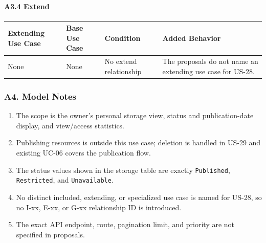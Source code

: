 \documentclass[12pt]{article}
\renewcommand{\baselinestretch}{1.5}
\begin{document}
\hypertarget{sec:a3-4-extend}{}
\paragraph*{A3.4 Extend}
\par\medskip

\begingroup
\small
\renewcommand{\baselinestretch}{1.0}\selectfont
\renewcommand{\arraystretch}{1.15}
\setlength{\tabcolsep}{6pt}
\begin{longtable}{|>{\raggedright\arraybackslash}p{}|>{\raggedright\arraybackslash}p{}|>{\raggedright\arraybackslash}p{}|>{\raggedright\arraybackslash}p{}|}
\hline
\textbf{Extending Use Case} & \textbf{Base Use Case} & \textbf{Condition} & \textbf{Added Behavior} \\ \hline
\endhead
None & None & No extend relationship & The proposals do not name an extending use case for US-28. \\ \hline
\end{longtable}
\endgroup
\par\medskip

\hypertarget{sec:a4-model-notes}{}
\subsubsection*{A4. Model Notes}
\par\medskip

\begin{enumerate}
\item The scope is the owner's personal storage view, status and publication-date display, and view/access statistics.
\item Publishing resources is outside this use case; deletion is handled in US-29 and existing UC-06 covers the publication flow.
\item The status values shown in the storage table are exactly \texttt{Published}, \texttt{Restricted}, and \texttt{Unavailable}.
\item No distinct included, extending, or specialized use case is named for US-28, so no I-xx, E-xx, or G-xx relationship ID is introduced.
\item The exact API endpoint, route, pagination limit, and priority are not specified in proposals.
\end{enumerate}
\par\medskip

\hypertarget{sec:part-b-use-case-specification}{}
\end{document}
